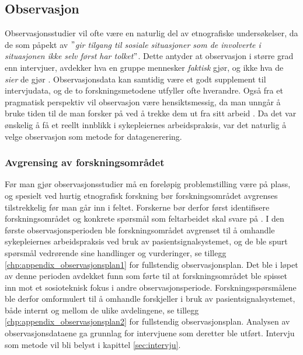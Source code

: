 \subsection{Observasjon}
\label{section:observasjon}
 
Observasjonsstudier vil ofte være en naturlig del av etnografiske undersøkelser, da de som påpekt av \citet{Tjora} \textit{$"$gir tilgang til sosiale situasjoner som de involverte i situasjonen ikke selv først har tolket$"$}. Dette antyder at observasjon i større grad enn intervjuer, avdekker hva en gruppe mennesker \textit{faktisk} gjør, og ikke hva de \textit{sier} de gjør \citep{Oates, Blomberg93, Tjora}. Observasjonsdata kan samtidig være et godt supplement til intervjudata, og de to forskningsmetodene utfyller ofte hverandre. Også fra et pragmatisk perspektiv vil observasjon være hensiktsmessig, da man unngår å bruke tiden til de man forsker på ved å trekke dem ut fra sitt arbeid \citep{Tjora}. Da det var ønskelig å få et reellt innblikk i sykepleiernes arbeidspraksis, var det naturlig å velge observasjon som metode for datagenerering.
 
\noindent
\subsubsection{Avgrensing av forskningsområdet}
Før man gjør observasjonsstudier må en foreløpig problemstilling være på plass, og spesielt ved hurtig etnografisk forskning bør forskningsområdet avgrenses tilstrekkelig før man går inn i feltet. Forskerne bør derfor først identifisere forskningsområdet og konkrete spørsmål som feltarbeidet skal svare på \citep{Tjora, Millen00}. I den første observasjonsperioden ble forskningsområdet avgrenset til å omhandle sykepleiernes arbeidspraksis ved bruk av pasientsignalsystemet, og de ble spurt spørsmål vedrørende sine handlinger og vurderinger, se tillegg \ref{chp:appendix_observasjonsplan1} for fullstendig observasjonsplan. Det ble i løpet av denne perioden avdekket funn som førte til at forskningsområdet ble spisset inn mot et sosioteknisk fokus i andre observasjonsperiode. Forskningsspørsmålene ble derfor omformulert til å omhandle forskjeller i bruk av pasientsignalsystemet, både internt og mellom de ulike avdelingene, se tillegg \ref{chp:appendix_observasjonsplan2} for fullstendig observasjonsplan. Analysen av observasjonsdataene ga grunnlag for intervjuene som deretter ble utført. Intervju som metode vil bli belyst i kapittel \ref{sec:intervju}.

